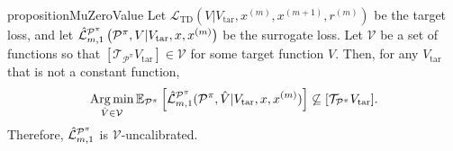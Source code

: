 \begin{restatable}{proposition}{MuZeroValue}\label{prop:cvaml:2_3}
    Let $\mathcal{L}_\mathrm{TD}(V|V_\mathrm{tar}, x^{(m)},x^{(m+1)},r^{(m)})$ be the target loss, and let $\hat{\mathcal{L}}^{\P^\pi}_{m,1}\left(\P^\pi,V| V_\mathrm{tar},x, x^{(m)}\right)$ be the surrogate loss. 
    Let $\mathcal{V}$ be a set of functions so that $[\mathcal{T}_{\mathcal{P}^\pi}V_\mathrm{tar}] \in \mathcal{V}$ for some target function $V$.
    Then, for any $V_\mathrm{tar}$ that is not a constant function, $$ \Argmin_{\hat{V} \in \mathcal{V}} \mathbb{E}_{\P^\pi}\squareb{\hat{\mathcal{L}}^{\P^\pi}_{m,1}(\P^\pi, \hat{V}| V_\mathrm{tar}, x, x^{(m)})} \not \subseteq [\mathcal{T}_{\P^\pi} V_\mathrm{tar}].$$
    Therefore, $\hat{\mathcal{L}}^{\P^\pi}_{m,1}$ is $\mathcal{V}$-uncalibrated.
\end{restatable}
